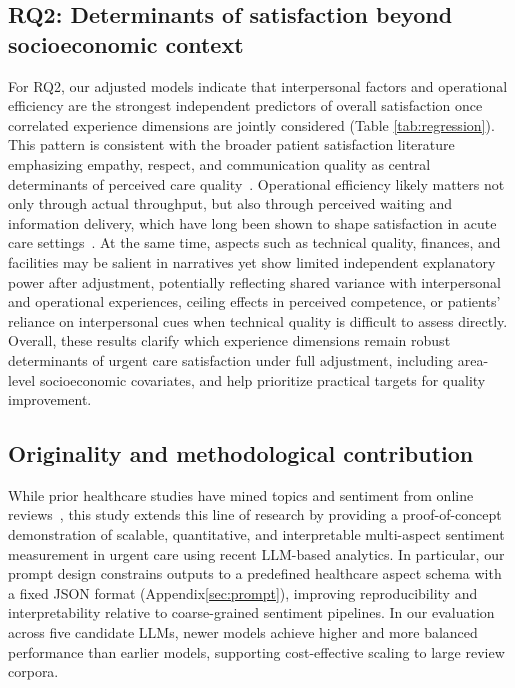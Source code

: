 \documentclass[journal,twoside,web]{ieeecolor}
\begin{document}
\subsection{RQ2: Determinants of satisfaction beyond socioeconomic context}
For RQ2, our adjusted models indicate that interpersonal factors and operational efficiency are the strongest independent predictors of overall satisfaction once correlated experience dimensions are jointly considered (Table \ref{tab:regression}). This pattern is consistent with the broader patient satisfaction literature emphasizing empathy, respect, and communication quality as central determinants of perceived care quality~\cite{batbaatar2017determinants,derksen2013effectiveness,manary2013patient}. Operational efficiency likely matters not only through actual throughput, but also through perceived waiting and information delivery, which have long been shown to shape satisfaction in acute care settings~\cite{thompson1996waiting,krishel1993info}. At the same time, aspects such as technical quality, finances, and facilities may be salient in narratives yet show limited independent explanatory power after adjustment, potentially reflecting shared variance with interpersonal and operational experiences, ceiling effects in perceived competence, or patients’ reliance on interpersonal cues when technical quality is difficult to assess directly. Overall, these results clarify which experience dimensions remain robust determinants of urgent care satisfaction under full adjustment, including area-level socioeconomic covariates, and help prioritize practical targets for quality improvement.

\subsection{Originality and methodological contribution}
While prior healthcare studies have mined topics and sentiment from online reviews~\cite{shah2021mining,ranard2016yelp,kilaru2016edreviews}, this study extends this line of research by providing a proof-of-concept demonstration of scalable, quantitative, and interpretable multi-aspect sentiment measurement in urgent care using recent LLM-based analytics. In particular, our prompt design constrains outputs to a predefined healthcare aspect schema with a fixed JSON format (Appendix\ref{sec:prompt}), improving reproducibility and interpretability relative to coarse-grained sentiment pipelines. In our evaluation across five candidate LLMs, newer models achieve higher and more balanced performance than earlier models, supporting cost-effective scaling to large review corpora.
\end{document}
